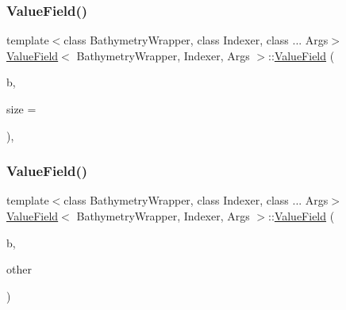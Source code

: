 \subsubsection{\texorpdfstring{Value\+Field()}{ValueField()}\hspace{0.1cm}{\footnotesize\ttfamily [1/3]}}
{\footnotesize\ttfamily template$<$class Bathymetry\+Wrapper, class Indexer, class ... Args$>$ \\
\hyperlink{structValueField}{Value\+Field}$<$ Bathymetry\+Wrapper, Indexer, Args $>$\+::\hyperlink{structValueField}{Value\+Field} (\begin{DoxyParamCaption}\item[{const \hyperlink{structBathymetry}{Bathymetry} \&}]{b,  }\item[{size\+\_\+t}]{size = {} }\end{DoxyParamCaption})\hspace{0.3cm}{\ttfamily [inline]}, {\ttfamily [explicit]}}

\mbox{\label{structValueField_a06fd34216812e1b62965b87358e57708}} 
\subsubsection{\texorpdfstring{Value\+Field()}{ValueField()}\hspace{0.1cm}{\footnotesize\ttfamily [2/3]}}
{\footnotesize\ttfamily template$<$class Bathymetry\+Wrapper, class Indexer, class ... Args$>$ \\
\hyperlink{structValueField}{Value\+Field}$<$ Bathymetry\+Wrapper, Indexer, Args $>$\+::\hyperlink{structValueField}{Value\+Field} (\begin{DoxyParamCaption}\item[{const \hyperlink{structBathymetry}{Bathymetry} \&}]{b,  }\item[{const \hyperlink{structBaseValueField}{Base\+Value\+Field}$<$ Bathymetry\+Wrapper, Indexer, Args $>$ \&}]{other }\end{DoxyParamCaption})\hspace{0.3cm}{\ttfamily [inline]}}

\mbox{\label{structValueField_aacd76ae7d4471b4f2e21a69e5c09fe8d}} 
